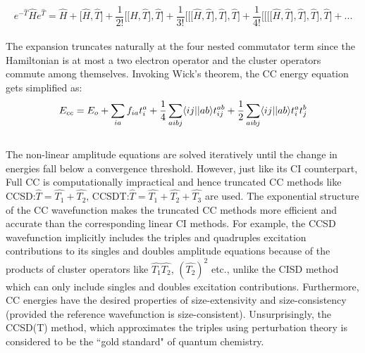 \\
\begin{equation}
e^{-\hat{T}}\hat{H}e^{\hat{T}} = \hat{H} + \lbrack\hat{H},\hat{T}\rbrack + \frac{1}{2!}\lbrack\lbrack\hat{H},\hat{T}\rbrack,\hat{T}\rbrack + \frac{1}{3!}\lbrack\lbrack\lbrack\hat{H},\hat{T}\rbrack,\hat{T}\rbrack,\hat{T}\rbrack + \frac{1}{4!}\lbrack\lbrack\lbrack\lbrack\hat{H},\hat{T}\rbrack,\hat{T}\rbrack,\hat{T}\rbrack,\hat{T}\rbrack + ...
\end{equation}
\\
The expansion truncates naturally at the four nested commutator term since the Hamiltonian is at most a two 
electron operator and the cluster operators commute among themselves\cite{}.
Invoking Wick's theorem\cite{Wick50}, the CC energy equation gets simplified as:
\\
\begin{equation}
E_{cc} = E_o + \sum_{ia}f_{ia}t^a_i + \frac{1}{4}\sum_{aibj}\langle ij || ab \rangle t^{ab}_{ij} + \frac{1}{2}\sum_{aibj}\langle ij || ab \rangle t^a_it^b_j
\end{equation} 
\\
The non-linear amplitude equations are solved iteratively until the change in energies
fall below a convergence threshold. However, just like its CI counterpart, Full CC is 
computationally impractical and hence truncated CC methods like CCSD:\;$\hat{T} =
\hat{T_1} + \hat{T_2}$, CCSDT:\;$\hat{T} = \hat{T_1} + \hat{T_2} + \hat{T_3}$ 
are used. The exponential structure of the CC wavefunction makes the truncated CC methods 
more efficient and accurate than the corresponding linear CI methods. For example,
the CCSD wavefunction implicitly includes the triples and quadruples excitation contributions to 
its singles and doubles amplitude equations because of the products of cluster operators like 
$\hat{T_1}\hat{T_2}$, ${(\hat{T_2})}^2$ etc., unlike the CISD method which can only include 
singles and doubles excitation contributions. Furthermore, CC energies have the desired 
properties of size-extensivity and size-consistency (provided the reference wavefunction is
size-consistent). Unsurprisingly, the CCSD(T)\cite{Shen12} method, which approximates the triples using
perturbation theory is considered to be the ``gold standard" of quantum chemistry.
